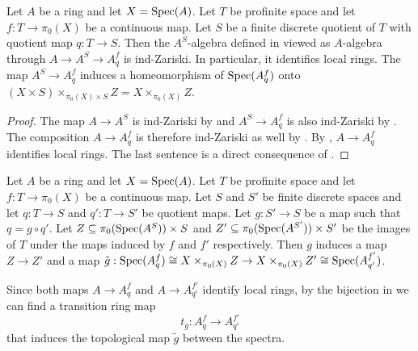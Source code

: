 \begin{lemma}
  \label{thm:modify-pi0-finite-properties}
  Let $A$ be a ring and let $X = \operatorname{Spec} (A)$. Let $T$ be profinite space and let $f : T \to \pi_0(X)$ be a continuous map. Let \(S\) be a finite discrete quotient of \(T\) with quotient map \(q : T \to S\). Then the $A^S$-algebra defined in  viewed as $A$-algebra through $A \to A^S \to A^f_{q}$ is ind-Zariski. In particular, it identifies local rings. The map $A^S \to A^f_{q}$ induces a homeomorphism of $\operatorname{Spec} (A^f_{q})$ onto \((X \times S) \times_{\pi_0(X) \times S} Z = X \times_{\pi_0(X)} Z\).
\end{lemma}

\begin{proof}
  The map $A \to A^S$ is ind-Zariski by  and $A^S \to A^f_{q}$ is also ind-Zariski by .  The composition $A \to A^f_{q}$ is therefore ind-Zariski as well by . By , $A \to A^f_{q}$ identifies local rings. The last sentence is a direct consequence of .
\end{proof}

\begin{definition}
  \label{def:modify-pi0-transition-map}
  Let $A$ be a ring and let $X = \operatorname{Spec} (A)$. Let $T$ be profinite space and let $f : T \to \pi_0(X)$ be a continuous map. Let \(S\) and \(S'\) be finite discrete spaces and let \(q : T \to S\) and \(q' : T \to S'\) be quotient maps. Let \(g : S' \to S\) be a map such that \(q = g \circ q'\). Let \(Z \subseteq \pi_0(\operatorname{Spec} (A^{S})) \times S\) and \(Z' \subseteq \pi_0(\operatorname{Spec} (A^{S'})) \times S'\) be the images of \(T\) under the maps induced by \(f\) and \(f'\) respectively. Then \(g\) induces a map \(Z \to Z'\) and a map \(\tilde{g} : \operatorname{Spec} (A^f_{q}) \cong X \times_{\pi_0(X)} Z \to X \times_{\pi_0(X)} Z' \cong \operatorname{Spec} (A^{f'}_{q'})\).

  Since both maps \(A \to A^f_{q}\) and \(A \to A^{f'}_{q'}\) identify local rings, by the bijection in  we can find a transition ring map
  \[t_{g}: A^f_{q} \to A^{f'}_{q'}\]
  that induces the topological map \(\tilde{g}\) between the spectra.
\end{definition}

